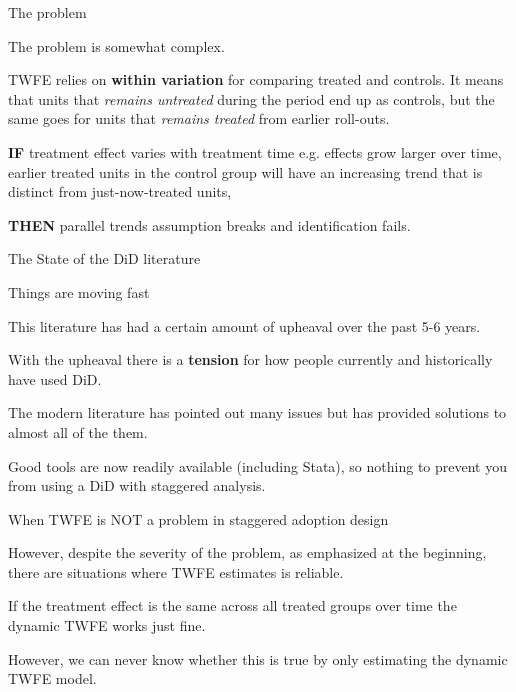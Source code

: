 \documentclass[notes,11pt, aspectratio=169]{beamer}
\newenvironment{wideitemize}{\itemize\addtolength{\itemsep}{10pt}}{\enditemize}
\begin{document}
\begin{frame}{The problem}
      \begin{wideitemize}
        \item The problem is somewhat complex. 
        \item TWFE relies on \textbf{within variation} for comparing treated and controls. It means that units that \textit{remains untreated} during the period end up as controls, but the same goes for units that \textit{remains treated} from earlier roll-outs.
        \item \textbf{IF} treatment effect varies with treatment time e.g. effects grow larger over time, earlier treated units in the control group will have an increasing trend that is distinct from just-now-treated units, 
        \item \textbf{THEN} parallel trends assumption breaks and identification fails.  
        \end{wideitemize}
        \end{frame}

\begin{frame}{The State of the DiD literature}
      \begin{wideitemize}
      \item Things are moving fast 

      \item This literature has had a certain amount of upheaval over the past 5-6 years. 
        
      \item With the upheaval there is a \textbf{tension} for how people currently and historically have used DiD.

      \item The modern literature has pointed out many issues but has provided solutions to almost all of the them.
      
      \item Good tools are now readily available (including Stata), so nothing to prevent you from using a DiD with staggered analysis.
      \end{wideitemize}
\end{frame}

\begin{frame}{When TWFE is NOT a problem in staggered adoption design}
      \begin{wideitemize}
         \item However, despite the severity of the problem, as emphasized at the beginning, there are situations where TWFE estimates is reliable.
      
         \item If the treatment effect is the same across all treated groups over time the dynamic TWFE works just fine. 

         \item However, we can never know whether this is true by only estimating the dynamic TWFE model.
        \end{wideitemize}
\end{frame}
\end{document}
